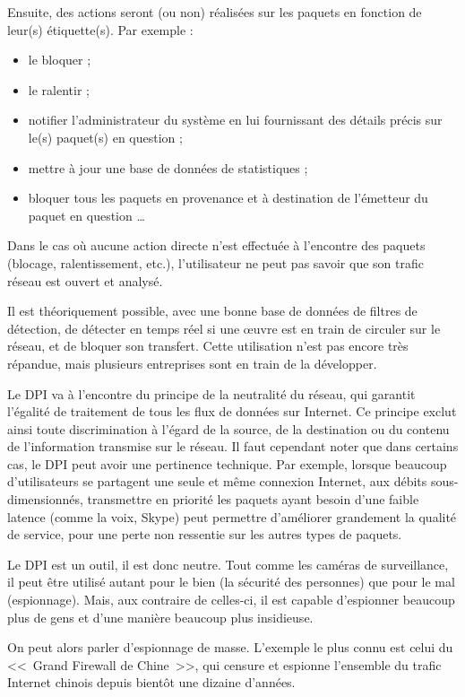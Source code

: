 Ensuite, des actions seront (ou non) réalisées sur les paquets en fonction de leur(s) étiquette(s).
Par exemple :

\begin{itemize}
\item le bloquer ;
\item le ralentir ;
\item notifier l'administrateur du système en lui fournissant des détails précis sur le(s) paquet(s) en question ;
\item mettre à jour une base de données de statistiques ;
\item bloquer tous les paquets en provenance et à destination de l'émetteur du paquet en question \dots{}
\end{itemize}

Dans le cas où aucune action directe n'est effectuée à l'encontre des paquets (blocage, ralentissement, etc.), l'utilisateur ne peut pas savoir que son trafic réseau est ouvert et analysé.

Il est théoriquement possible, avec une bonne base de données de filtres de détection, de détecter en temps réel si une œuvre est en train de circuler sur le réseau, et de bloquer son transfert.
Cette utilisation n'est pas encore très répandue, mais plusieurs entreprises sont en train de la développer.

Le DPI va à l'encontre du principe de la neutralité du réseau, qui garantit l'égalité de traitement de tous les flux de données sur Internet.
Ce principe exclut ainsi toute discrimination à l'égard de la source, de la destination ou du contenu de l'information transmise sur le réseau.
Il faut cependant noter que dans certains cas, le DPI peut avoir une pertinence technique.
Par exemple, lorsque beaucoup d'utilisateurs se partagent une seule et même connexion Internet, aux débits sous-dimensionnés, transmettre en priorité les paquets ayant besoin d'une faible latence (comme la voix, Skype) peut permettre d'améliorer grandement la qualité de service, pour une perte non ressentie sur les autres types de paquets.

Le DPI est un outil, il est donc neutre.
Tout comme les caméras de surveillance, il peut être utilisé autant pour le bien (la sécurité des personnes) que pour le mal (espionnage).
Mais, aux contraire de celles-ci, il est capable d'espionner beaucoup plus de gens et d'une manière beaucoup plus insidieuse.

On peut alors parler d'espionnage de masse.
L'exemple le plus connu est celui du <<~Grand Firewall de Chine~>>, qui censure et espionne l'ensemble du trafic Internet chinois depuis bientôt une dizaine d'années.

